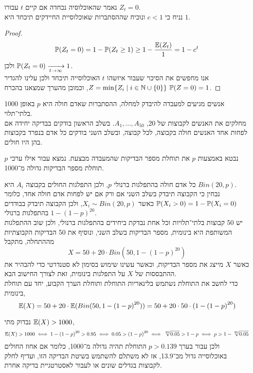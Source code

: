 \subquestion{}
נאמר שהאוכלוסיה נכחדה אם קיים $t$ עבורו $Z_t = 0$. \\
נניח כי $c < 1$ ונוכיח שההסתברות שאוכלוסיית החיידקים תיכחד היא $1$.
\begin{proof}
	\[
		\mathbb{P}(Z_t = 0)
		= 1 - \mathbb{P}(Z_t \ge 1)
		\ge 1 - \frac{\mathbb{E}(Z_t)}{1}
		= 1 - c^t
	\]
	ולכן $\mathbb{P}(Z_t = 0) \xrightarrow[t \to \infty]{} 1$. \\
	אנו מחפשים את הסיכוי שעבור איזשהו $t$ האוכלוסייה תיכחד ולכן עלינו להגדיר $Z = \min\{Z_i \mid i \in \mathbb{N} \cup \{0\}\}$, וכמובן מהערך שמצאנו בהכרח $\mathbb{P}(Z = 0) = 1$.
\end{proof}

\question{}
1000 אנשים מגיעים למעבדה להיבדק למחלה, ההסתברות שאדם חולה היא $p$ באופן בלתי־תלוי. \\
מחלקים את האנשים לקבוצות של 20, $A_1, \dots, A_{50}$.
בשלב הראשון בודקים בבדיקה יחידה אם לפחות אחד האנשים חולה בקבוצה, לכל קבוצה, ובשלב השני בודקים כל אדם בנפרד בקבוצות בהן היו חולים.

\subquestion{}
נבטא באמצעות $p$ את תוחלת מספר הבדיקות שהמעבדה מבצעת.
נמצא עבור אילו ערכי $p$ תוחלת מספר הבדיקות גדולה מ־1000.
\begin{solution}
	כל אדם חולה בהתפלגות ברנולי $p$, ולכן התפלגות החולים בקבוצה $A_i$ היא $Bin(20, p)$. \\
	נבחין כי הקבוצה תיבדק בשלב השני אם ורק אם יש לפחות אדם חולה אחד, כלומר $\mathbb{P}(X_i > 0) = 1 - \mathbb{P}(X_i = 0)$ כאשר $X_i \sim Bin(20, p)$, ולכן הקבוצה תיבדק בבודדים בהתפלגות ברנולי $1 - {(1 - p)}^{20}$. \\
	יש 50 קבוצות בלתי־תלויות וכל אחת נבדקת ביחידים בהתפלגות ברנולי, ולכן שוב ההתפלגות המשותפת היא בינומית, מספר הבדיקות בשלב השני, ונוסיף את 50 הבדיקות הקבוצתיות מההתחלה, מתקבל
	\[
		X = 50 + 20 \cdot Bin(50, 1 - {(1 - p)}^{20})
	\]
	כאשר $X$ מייצג את מספר הבדיקות, וכאשר עשינו שימוש בסימון לא סטנדרטי כדי להבהיר את ההתבססות של $X$ על התפלגות בינומית, זאת לצורך החישוב הבא. \\
	כדי לחשב את התוחלת נשתמש בלינאריות התוחלת ותוחלת הערך הקבוע, יחד עם תוחלת בינומית,
	\[
		\mathbb{E}(X)
		= 50 + 20 \cdot \mathbb{E}(Bin(50, 1 - {(1 - p)}^{20}))
		= 50 + 20 \cdot 50 \cdot (1 - {(1 - p)}^{20})
	\]

	נבדוק מתי $\mathbb{E}(X) > 1000$,
	\[
		\mathbb{E}(X) > 1000
		\iff 1 - {(1 - p)}^{20} > 0.95
		\iff 0.05 > {(1 - p)}^{20}
		\iff \sqrt[20]{0.05} > 1 - p
		\iff p > 1 - \sqrt[20]{0.05}
	\]
	ולכן עבור בערך $p > 0.139$ התוחלת תהיה גדולה מ־1000, כלומר אם אחוז החולים באוכלוסייה גדול מכ־13.9, אז לא משתלם להשתמש בשיטת הבדיקה הזו, ועדיף לחלק לקבוצות בגדלים שונים או לעבור לאסטרטגיית בדיקה אחרת.
\end{solution}

